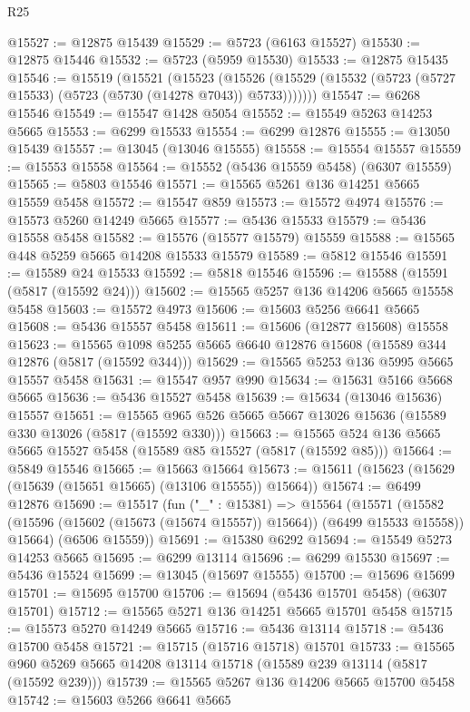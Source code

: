 \begin{lexlean}{R25}
\begin{coremodule}
@15527 := @12875 @15439
@15529 := @5723 (@6163 @15527)
@15530 := @12875 @15446
@15532 := @5723 (@5959 @15530)
@15533 := @12875 @15435
@15546 := @15519
    (@15521
      (@15523
        (@15526 (@15529 (@15532 (@5723 (@5727 @15533) (@5723 (@5730 (@14278 @7043)) @5733)))))))
@15547 := @6268 @15546
@15549 := @15547 @1428 @5054
@15552 := @15549 @5263 @14253 @5665
@15553 := @6299 @15533
@15554 := @6299 @12876
@15555 := @13050 @15439
@15557 := @13045 (@13046 @15555)
@15558 := @15554 @15557
@15559 := @15553 @15558
@15564 := @15552 (@5436 @15559 @5458) (@6307 @15559)
@15565 := @5803 @15546
@15571 := @15565 @5261 @136 @14251 @5665 @15559 @5458
@15572 := @15547 @859
@15573 := @15572 @4974
@15576 := @15573 @5260 @14249 @5665
@15577 := @5436 @15533
@15579 := @5436 @15558 @5458
@15582 := @15576 (@15577 @15579) @15559
@15588 := @15565 @448 @5259 @5665 @14208 @15533 @15579
@15589 := @5812 @15546
@15591 := @15589 @24 @15533
@15592 := @5818 @15546
@15596 := @15588 (@15591 (@5817 (@15592 @24)))
@15602 := @15565 @5257 @136 @14206 @5665 @15558 @5458
@15603 := @15572 @4973
@15606 := @15603 @5256 @6641 @5665
@15608 := @5436 @15557 @5458
@15611 := @15606 (@12877 @15608) @15558
@15623 := @15565 @1098 @5255 @5665 @6640 @12876 @15608 (@15589 @344 @12876 (@5817 (@15592 @344)))
@15629 := @15565 @5253 @136 @5995 @5665 @15557 @5458
@15631 := @15547 @957 @990
@15634 := @15631 @5166 @5668 @5665
@15636 := @5436 @15527 @5458
@15639 := @15634 (@13046 @15636) @15557
@15651 := @15565 @965 @526 @5665 @5667 @13026 @15636 (@15589 @330 @13026 (@5817 (@15592 @330)))
@15663 := @15565 @524 @136 @5665 @5665 @15527 @5458 (@15589 @85 @15527 (@5817 (@15592 @85)))
@15664 := @5849 @15546
@15665 := @15663 @15664
@15673 := @15611 (@15623 (@15629 (@15639 (@15651 @15665) (@13106 @15555)) @15664))
@15674 := @6499 @12876
@15690 := @15517
    (fun ("_" : @15381) =>
    @15564
      (@15571
        (@15582 (@15596 (@15602 (@15673 (@15674 @15557)) @15664)) (@6499 @15533 @15558))
        @15664)
      (@6506 @15559))
@15691 := @15380 @6292
@15694 := @15549 @5273 @14253 @5665
@15695 := @6299 @13114
@15696 := @6299 @15530
@15697 := @5436 @15524
@15699 := @13045 (@15697 @15555)
@15700 := @15696 @15699
@15701 := @15695 @15700
@15706 := @15694 (@5436 @15701 @5458) (@6307 @15701)
@15712 := @15565 @5271 @136 @14251 @5665 @15701 @5458
@15715 := @15573 @5270 @14249 @5665
@15716 := @5436 @13114
@15718 := @5436 @15700 @5458
@15721 := @15715 (@15716 @15718) @15701
@15733 := @15565 @960 @5269 @5665 @14208 @13114 @15718 (@15589 @239 @13114 (@5817 (@15592 @239)))
@15739 := @15565 @5267 @136 @14206 @5665 @15700 @5458
@15742 := @15603 @5266 @6641 @5665

\end{coremodule}
\end{lexlean}
